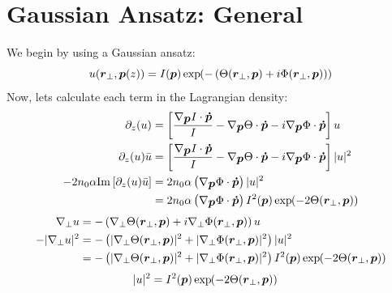\section{Gaussian Ansatz: General}

We begin by using a Gaussian ansatz:
\begin{equation}
    u(\vect{r}_{\perp},\vect{p}(z)) = I(\vect{p}) \exp{- \left(\Theta(\vect{r}_{\perp},\vect{p}) + i \Phi(\vect{r}_{\perp},\vect{p}) \right)}
\end{equation}
Now, lets calculate each term in the Lagrangian density:
\begin{equation}
    \begin{split}
    \partial_{z}(u) &= \left[ \frac{\nabla_{\vect{p}}{I}\cdot\vect{\dot{p}}}{I} - \nabla_{\vect{p}}{\Theta}\cdot\vect{\dot{p}} - i \nabla_{\vect{p}}{\Phi}\cdot\vect{\dot{p}} \right] u\\
    \partial_{z}(u)\conj{u} &= \left[ \frac{\nabla_{\vect{p}}{I}\cdot\vect{\dot{p}}}{I} -\nabla_{\vect{p}}{\Theta}\cdot\vect{\dot{p}} - i \nabla_{\vect{p}}{\Phi}\cdot\vect{\dot{p}} \right] |u|^2 \\
   -2 n_0 \alpha \Im{\partial_{z}(u)\conj{u}} &= 2 n_0 \alpha \left(\nabla_{\vect{p}}{\Phi}\cdot\vect{\dot{p}}\right) |u|^2 \\    
   &= 2 n_0 \alpha \left(\nabla_{\vect{p}}{\Phi}\cdot\vect{\dot{p}}\right) I^2(\vect{p})\exp{-2 \Theta(\vect{r}_{\perp},\vect{p})} \\    
    \end{split}
\end{equation}
\begin{equation}
    \begin{split}
        \nabla_{\perp} u &= -\left(\nabla_{\perp}\Theta(\vect{r}_{\perp},\vect{p}) + i \nabla_{\perp}\Phi(\vect{r}_{\perp},\vect{p}) \right) u \\
    -|\nabla_{\perp} u|^2 &= - \left(|\nabla_{\perp}\Theta(\vect{r}_{\perp},\vect{p})|^2 + |\nabla_{\perp}\Phi(\vect{r}_{\perp},\vect{p})|^2 \right)|u|^2 \\
    &= - \left(|\nabla_{\perp}\Theta(\vect{r}_{\perp},\vect{p})|^2 + |\nabla_{\perp}\Phi(\vect{r}_{\perp},\vect{p})|^2 \right)I^2(\vect{p})\exp{-2 \Theta(\vect{r}_{\perp},\vect{p})} 
    \end{split}
\end{equation}
\begin{equation}
    \begin{split}
    |u|^2 &= I^2(\vect{p})\exp{-2 \Theta(\vect{r}_{\perp},\vect{p})}  
    \end{split}
\end{equation}

